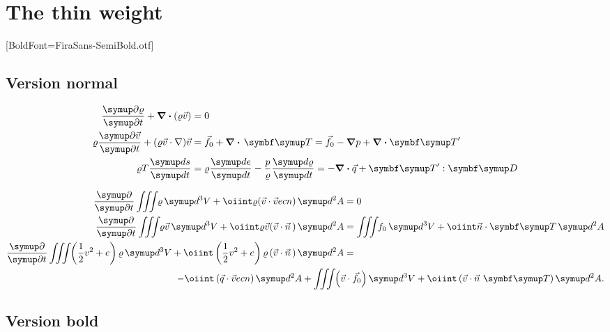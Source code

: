 \documentclass[english,log-declarations=false]{article}
\begin{document}
\unsetBold

\iffalse
\section{The thin  weight}

\setsansfont{FiraSans-Thin.otf}[BoldFont=FiraSans-SemiBold.otf]

\subsection{Version normal}

\begin{align}
\begin{aligned}
  \Q{\varrho}{t}+\div(\varrho\vec{v}) &= 0 \\
  \varrho\Q{\vec{v}}{t}+(\varrho\vec{v}\cdot\nabla)\vec{v}   &= \vec{f}_0+\div\,\TT=\vec{f}_0
	-\grad p+\div\TT' \\
  \varrho T\frac{\diff s}{\diff t}               &= \varrho\frac{\diff e}{\diff t}
    -\frac{p}{\varrho}\frac{\diff\varrho}{\diff t}=-\div\vec{q}+\TT':\DD 
\end{aligned}
\end{align}

\begin{align}
 \Q{}{t}\iiint\<\varrho\diff^3V+\oiint\varrho(\vec{v}\cdot\vec{v}ec{n})\diff^2A          &= 0\\
 \Q{}{t}\iiint\<\varrho\vec{v}\diff^3V+\oiint\varrho\vec{v}(\vec{v}\cdot\vec{n}\,)\diff^2A &=
        \iiint\<f_0\diff^3V+\oiint\vec{n}\cdot\TT\diff^2A \\
 \Q{}{t}\iiint\<\left(\half v^2+e\right)\varrho\diff^3V+\oiint\left(\half v^2+e\right)
        \varrho\left(\vec{v}\cdot\vec{n}\,\right)\diff^2A                                & =\\
 \multispan2{\hfill${\displaystyle-\oiint\left(\vec{q}\cdot\vec{v}ec{n}\right)\diff^2A+
         \iiint\<\left(\vec{v}\cdot\vec{f}_0\right)\diff^3V+\oiint\left(\vec{v}
         \cdot\vec{n}~\TT\right)\diff^2A}$}.\nonumber
\end{align}

\subsection{Version bold}
\end{document}
